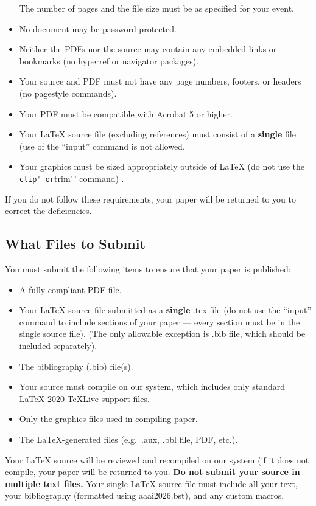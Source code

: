 \documentclass[letterpaper]{article} %
\providecommand{\tightlist}{%
  \setlength{\itemsep}{0pt}\setlength{\parskip}{0pt}}
\begin{document}
\begin{itemize}
  The number of pages and the file size must be as specified for your
  event.
\item
  No document may be password protected.
\item
  Neither the PDFs nor the source may contain any embedded links or
  bookmarks (no hyperref or navigator packages).
\item
  Your source and PDF must not have any page numbers, footers, or
  headers (no pagestyle commands).
\item
  Your PDF must be compatible with Acrobat 5 or higher.
\item
  Your {\LaTeX} source file (excluding references) must consist of a
  \textbf{single} file (use of the ``input'' command is not allowed.
\item
  Your graphics must be sized appropriately outside of {\LaTeX} (do not
  use the \texttt{clip"\ or}trim'\,' command) .
\end{itemize}

If you do not follow these requirements, your paper will be returned to
you to correct the deficiencies.

\subsection{What Files to Submit}\label{what-files-to-submit}

You must submit the following items to ensure that your paper is
published:

\begin{itemize}
\tightlist
\item
  A fully-compliant PDF file.
\item
  Your {\LaTeX} source file submitted as a \textbf{single} .tex file (do
  not use the ``input'' command to include sections of your paper ---
  every section must be in the single source file). (The only allowable
  exception is .bib file, which should be included separately).
\item
  The bibliography (.bib) file(s).
\item
  Your source must compile on our system, which includes only standard
  {\LaTeX} 2020 TeXLive support files.
\item
  Only the graphics files used in compiling paper.
\item
  The {\LaTeX}-generated files (e.g.~.aux, .bbl file, PDF, etc.).
\end{itemize}

Your {\LaTeX} source will be reviewed and recompiled on our system (if
it does not compile, your paper will be returned to you. \textbf{Do not
submit your source in multiple text files.} Your single {\LaTeX} source
file must include all your text, your bibliography (formatted using
aaai2026.bst), and any custom macros.
\end{document}
